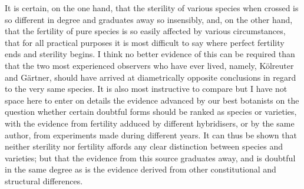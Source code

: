 \indent It is certain, on the one hand, that the sterility of various species when crossed is so different in degree and graduates away so insensibly, and, on the other hand, that the fertility of pure species is so easily affected by various circumstances, that for all practical purposes it is most difficult to say where perfect fertility ends and sterility begins. I think no better evidence of this can be required than that the two most experienced observers who have ever lived, namely, K\"{o}lreuter and G\"{a}rtner, should have arrived at diametrically opposite conclusions in regard to the very same species. It is also most instructive to compare but I have not space here to enter on details the evidence advanced by our best botanists on the question whether certain doubtful forms should be ranked as species or varieties, with the evidence from fertility adduced by different hybridisers, or by the same author, from experiments made during different years. It can thus be shown that neither sterility nor fertility affords any clear distinction between species and varieties; but that the evidence from this source graduates away, and is doubtful in the same degree as is the evidence derived from other constitutional and structural differences.\\
